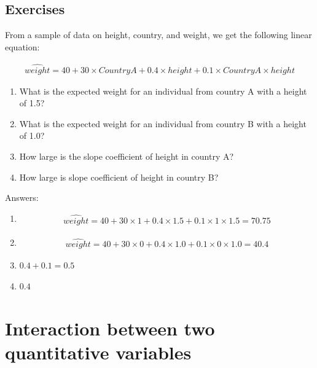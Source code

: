 \documentclass[]{report}\usepackage[]{graphicx}\usepackage[]{color}
\begin{document}
\subsection{Exercises}

From a sample of data on height, country, and weight, we get the following linear equation:


\begin{eqnarray}
\widehat{weight}= 40 + 30 \times CountryA + 0.4\times height + 0.1 \times CountryA\times height \nonumber
\end{eqnarray}

\begin{enumerate}
\item What is the expected weight for an individual from country A with a height of 1.5?\\
\item What is the expected weight for an individual from country B with a height of 1.0?\\
\item How large is the slope coefficient of height in country A? \\
\item How large is slope coefficient of height in country B?\\
\end{enumerate}

Answers:

\begin{enumerate}

\item 
\begin{eqnarray}
\widehat{weight}= 40 + 30 \times 1 + 0.4\times 1.5 + 0.1 \times 1\times 1.5 =70.75 \nonumber
\end{eqnarray}

\item
\begin{eqnarray}
\widehat{weight}= 40 + 30 \times 0 + 0.4\times 1.0 + 0.1 \times 0\times 1.0 =40.4\nonumber
\end{eqnarray}


\item{$0.4 + 0.1 = 0.5$}

\item{$0.4$}


\end{enumerate}


\section{Interaction between two quantitative variables}
\end{document}
